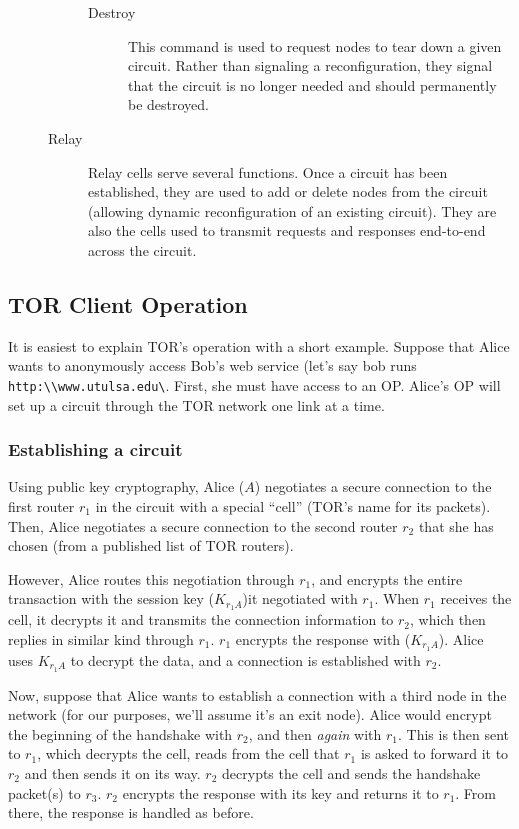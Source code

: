 \documentclass[letterpaper, titlepage, 12pt]{article}
\begin{document}
\begin{description}
\begin{description}
\begin{description}
			\item[Destroy] This command is used to request nodes to tear down a given circuit. Rather than signaling a reconfiguration, they signal that the circuit is no longer needed and should permanently be destroyed.
		\end{description}
		\item[Relay] Relay cells serve several functions. Once a circuit has been established, they are used to add or delete nodes from the circuit (allowing dynamic reconfiguration of an existing circuit). They are also the cells used to transmit requests and responses end-to-end across the circuit.
	\end{description}
\end{description}

\subsection{TOR Client Operation}
It is easiest to explain TOR's operation with a short example. Suppose that Alice wants to anonymously access Bob's web service (let's say bob runs \verb+http:\\www.utulsa.edu\+. First, she must have access to an OP. Alice's OP will set up a circuit through the TOR network one link at a time. 
\subsubsection{Establishing a circuit}
Using public key cryptography, Alice ($A$) negotiates a secure connection to the first router $r_1$ in the circuit with a special ``cell'' (TOR's name for its packets). Then, Alice negotiates a secure connection to the second router $r_2$ that she has chosen (from a published list of TOR routers). 

However, Alice routes this negotiation through $r_1$, and encrypts the entire transaction with the session key ($K_{r_1A}$)it negotiated with $r_1$. When $r_1$ receives the cell, it decrypts it and transmits the connection information to $r_2$, which then replies in similar kind through $r_1$. $r_1$ encrypts the response with ($K_{r_1A}$). Alice uses $K_{r_1A}$ to decrypt the data, and a connection is established with $r_2$.

Now, suppose that Alice wants to establish a connection with a third node in the network (for our purposes, we'll assume it's an exit node). Alice would encrypt the beginning of the handshake with $r_2$, and then \emph{again} with $r_1$. This is then sent to $r_1$, which decrypts the cell, reads from the cell that $r_1$ is asked to forward it to $r_2$ and then sends it on its way. $r_2$ decrypts the cell and sends the handshake packet(s) to $r_3$. $r_2$ encrypts the response with its key and returns it to $r_1$. From there, the response is handled as before.
\end{document}
